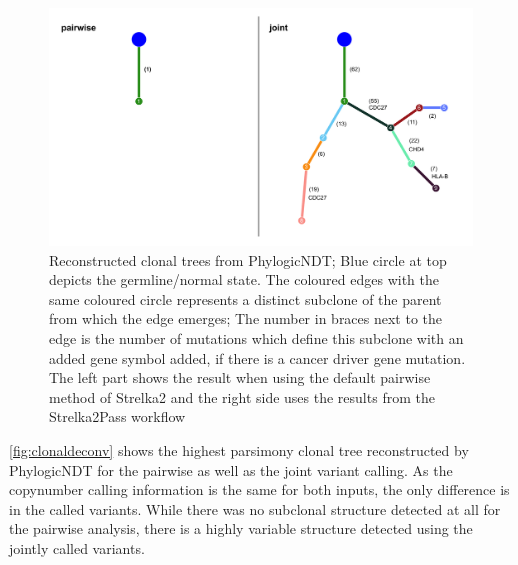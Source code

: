 \begin{figure}[!ht]
\centering
\includegraphics[width=.99\linewidth]{Figures/clonalDeconv.pdf}
\caption[Reconstructed clonal trees for joint and pairwise variant calling]{Reconstructed clonal trees from PhylogicNDT; Blue circle at top depicts the germline/normal state. The coloured edges with the same coloured circle represents a distinct subclone of the parent from which the edge emerges; The number in braces next to the edge is the number of mutations which define this subclone with an added gene symbol added, if there is a cancer driver gene mutation. The left part shows the result when using the default pairwise method of Strelka2 and the right side uses the results from the Strelka2Pass workflow}\label{fig:clonaldeconv}
\end{figure}


\autoref{fig:clonaldeconv} shows the highest parsimony clonal tree reconstructed by PhylogicNDT for the pairwise as well as the joint variant calling. As the copynumber calling information is the same for both inputs, the only difference is in the called variants. While there was no subclonal structure detected at all for the pairwise analysis, there is a highly variable structure detected using the jointly called variants.
